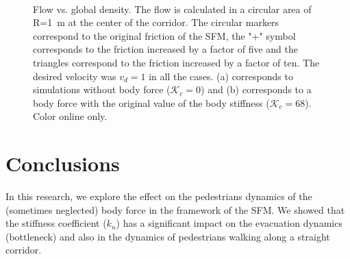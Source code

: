 \documentclass[preprint,12pt]{elsarticle}
\begin{document}
\begin{figure}[!htbp]
\centering
    \ 
    \\
\caption[width=0.47\columnwidth]{Flow vs. global density. The flow is calculated in a circular area of R=1~m at the center of the corridor. The circular markers correspond to the original friction of the SFM, the "+" symbol corresponds to the friction increased by a factor of five and the triangles correspond to the friction increased by a factor of ten. The desired velocity was $v_d=1$ in all the cases. (a) corresponds to simulations without body force ($\mathcal{K}_c =$0) and (b) corresponds to a body force with the original value of the body stiffness ($\mathcal{K}_c =$68). Color online only.}
\label{flow_density}
\end{figure}



\section{\label{conclusions}Conclusions}


In this research, we explore the effect on the pedestrians dynamics of the (sometimes neglected) body force in the framework of the SFM. We showed that the stiffness coefficient ($k_n$) has a significant impact on the evacuation dynamics (bottleneck) and also in the dynamics of pedestrians walking along a straight corridor.\\
\end{document}
